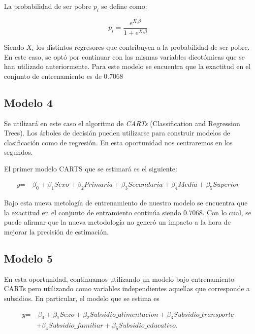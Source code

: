 \documentclass[11pt, a4paper]{article}
\begin{document}
La probabilidad de ser pobre $p_i $  se define como:

\[
p_i = \frac{e^{X_i \beta}}{1 + e^{X_i \beta}}
\]	

Siendo $X_i$ los distintos regresores que contribuyen a la probabilidad de ser pobre. En este caso, se optó por continuar con las mismas variables dicotómicas que se han utilizado anteriormente. Para este modelo se encuentra que la exactitud en el conjunto de entrenamiento es de 0.7068

\subsection*{Modelo 4}

Se utilizará en este caso el algoritmo de \textit{CARTs}  (Classification and Regression Trees). Los árboles de decisión pueden utilizarse para construir modelos de clasificación como de regresión. En esta oportunidad nos centraremos en los segundos. 

El primer modelo CARTS que se estimará es el siguiente: 

\[
\begin{aligned}
\textit{y} = &\ \beta_0  + \beta_1 \textit{Sexo} + \beta_2 \textit{Primaria} 
+ \beta_3 \textit{Secundaria} + \beta_4 \textit{Media}  + \beta_5 \textit{Superior} 
\end{aligned}
\]

Bajo esta nueva metología de entrenamiento de nuestro modelo se encuentra que la exactitud en el conjunto de entramiento continúa siendo 0.7068. Con lo cual, se puede afirmar que la nueva metodología no generó un impacto a la hora de mejorar la precisión de estimación. 


\subsection*{Modelo 5}

En esta oportunidad, continuamos utilizando un modelo bajo entrenamiento CARTs pero utilizando como variables independientes aquellas que corresponde a subsidios. En particular, el modelo que se estima es 

\[
\begin{aligned}
\textit{y} = &\ \beta_0 + \beta_1 \textit{Sexo} + \beta_2 \textit{Subsidio\_alimentacion} 
+ \beta_3 \textit{Subsidio\_transporte} \\
& + \beta_4 \textit{Subsidio\_familiar} + \beta_{5} \textit{Subsidio\_educativo}.
\end{aligned}
\]
\end{document}
